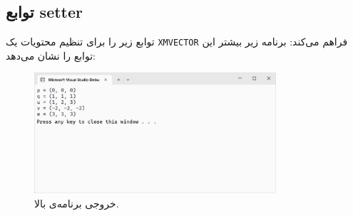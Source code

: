 \subsection{\textbf{توابع setter}}
\label{subsec:1.6.7}
{
    \Large
    \begin{spacing}{1.5}
         توابع زیر را برای تنظیم محتویات یک \texttt{XMVECTOR} فراهم می‌کند:
        \textbf{\vspace{6pt}}
        \lr{}
        \textbf{\vspace{6pt}}
        برنامه زیر بیشتر این توابع را نشان می‌دهد:
        \textbf{\vspace{6pt}}
        \lr{}
        \textbf{\vspace{-30pt}}
        \begin{figure}[H]
            \centering
            \setlength{\belowcaptionskip}{-10pt}
            \includegraphics[width=0.8\textwidth]{Images/4/1/4.Session.1.1.18}
            \caption {خروجی برنامه‌ی بالا.}
            \label{fig:4.Session.1.1.18}
        \end{figure}
    \end{spacing}
}

\textbf{\vspace{-10pt}}

